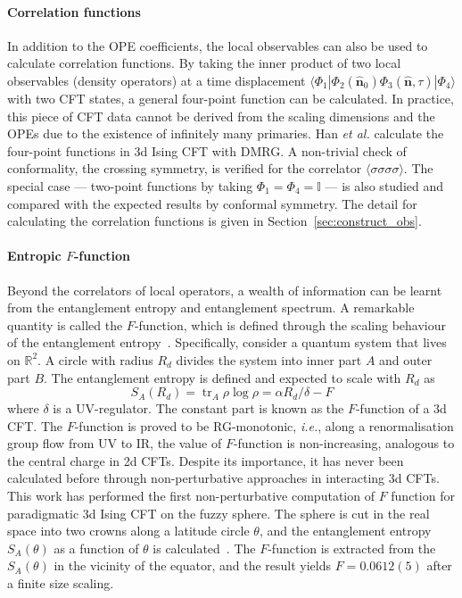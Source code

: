 \documentclass{timesjhep}
\begin{document}
\paragraph{Correlation functions~\cite{Han2023Jun}}

In addition to the OPE coefficients, the local observables can also be used to calculate correlation functions. By taking the inner product of two local observables (density operators) at a time displacement $\langle\Phi_1|\Phi_2(\hat{\mathbf{n}}_0)\Phi_3(\hat{\mathbf{n}},\tau)|\Phi_4\rangle$ with two CFT states, a general four-point function can be calculated. In practice, this piece of CFT data cannot be derived from the scaling dimensions and the OPEs due to the existence of infinitely many primaries. Han \textit{et al.} calculate the four-point functions in 3d Ising CFT with DMRG. A non-trivial check of conformality, the crossing symmetry, is verified for the correlator $\langle\sigma\sigma\sigma\sigma\rangle$. The special case --- two-point functions by taking $\Phi_1=\Phi_4=\mathbb{I}$ --- is also studied and compared with the expected results by conformal symmetry. The detail for calculating the correlation functions is given in Section~\ref{sec:construct_obs}.

\paragraph{Entropic $F$-function~\cite{Hu2024}}

Beyond the correlators of local operators, a wealth of information can be learnt from the entanglement entropy and entanglement spectrum. A remarkable quantity is called the $F$-function, which is defined through the scaling behaviour of the entanglement entropy~\cite{Myers2010Fthm,Casini2011Fthm,Jafferis2011Fthm,Klebanov2011Fthm,Casini2012Fthm}. Specifically, consider a quantum system that lives on $\mathbb{R}^2$. A circle with radius $R_d$ divides the system into inner part $A$ and outer part $B$. The entanglement entropy is defined and expected to scale with $R_d$ as \begin{equation}
    S_A(R_d)=\operatorname{tr}_A\rho\log\rho=\alpha R_d/\delta-F 
\end{equation}
where $\delta$ is a UV-regulator. The constant part is known as the $F$-function of a 3d CFT. The $F$-function is proved to be RG-monotonic, \textit{i.e.}, along a renormalisation group flow from UV to IR, the value of $F$-function is non-increasing, analogous to the central charge in 2d CFTs. Despite its importance, it has never been calculated before through non-perturbative approaches in interacting 3d CFTs. This work has performed the first non-perturbative computation of $F$ function for paradigmatic 3d Ising CFT on the fuzzy sphere. The sphere is cut in the real space into two crowns along a latitude circle $\theta$, and the entanglement entropy $S_A(\theta)$ as a function of $\theta$ is calculated~\cite{Sterdyniak2011RealEnt,Dubail2011RealEnt,Zaletel2012RealEnt,Rodriguez2011RealEnt}. The $F$-function is extracted from the $S_A(\theta)$ in the vicinity of the equator, and the result yields $F=0.0612(5)$ after a finite size scaling. 
\end{document}
